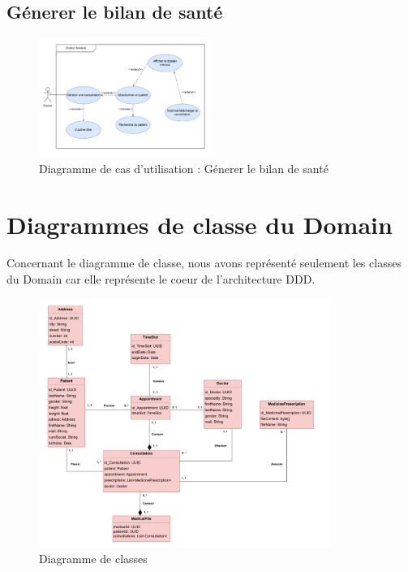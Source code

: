 \documentclass[a4paper]{report}
\begin{document}
\subsection{Génerer le bilan de santé}
\begin{figure}[H]
    \vspace{-10pt}
    \centering
    \includegraphics[width=0.5\textwidth]{besoins/bilan-sante.png}
    \caption{Diagramme de cas d'utilisation : Génerer le bilan de santé}
    \label{fig:DCU8}
\end{figure}

\section{Diagrammes de classe du Domain}
Concernant le diagramme de classe, nous avons représenté seulement les classes du Domain car elle représente le coeur de l'architecture DDD.
\begin{figure}[H]
    \vspace{-10pt}
    \centering
    \includegraphics[width=0.85\textwidth]{besoins/class_diagram.png}
    \caption{Diagramme de classes}
    \label{fig:DCU9}
\end{figure}
\end{document}
